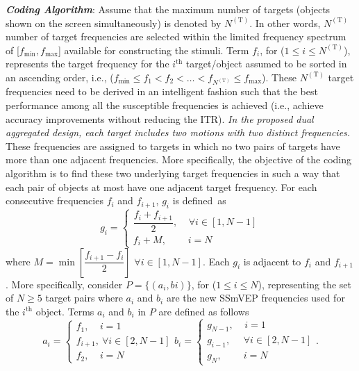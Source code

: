 \documentclass[sensors,accept,moreauthors,pdftex,10pt,a4paper]{mdpi}
\def\NT{N^{(\text{T})}}
\theoremstyle{mdpi}
\newcounter{thm}
\newcounter{ex}
\newcounter{re}
\theoremstyle{mdpidefinition}
\begin{document}
\vspace{.1in}
\noindent
\textbf{\textit{Coding Algorithm}}:
Assume that the maximum number of targets (objects shown on the screen simultaneously) is  denoted by $\NT$. In other words, $\NT$ number of target frequencies are selected within the limited frequency spectrum of [$f_{\min}, f_{\max}$] available for constructing the stimuli.  Term $f_{i}$, for ($1 \leq i \leq \NT$), represents the target frequency for the $i^{\text{th}}$ target/object assumed to be sorted in an ascending order, i.e., ($f_{\min} \leq f_1 < f_2 < \ldots < f_{\NT} \leq f_{\max}$). These $\NT$ target frequencies need to be derived in an intelligent fashion such that the best performance among all the susceptible frequencies is achieved (i.e., achieve accuracy improvements without reducing the ITR).
%
\textit{In the proposed dual aggregated design, each target includes two motions with two distinct frequencies.} These frequencies are assigned to targets in which no two pairs of targets have more than one adjacent frequencies. More specifically, the objective of the coding algorithm is to find these two underlying target frequencies in such a way that each pair of objects at most have one adjacent target frequency. For each consecutive frequencies $f_{i}$ and $f_{i+1}$,  $g_{i}$ is defined~as
%
\begin{equation}
g_{i} =
\begin{cases}
\dfrac{f_{i} + f_{i+1}}{2},  \:\:\:\:\:               \forall i \in [1,N-1]\\
f_{i} + M,        \:\:\:\:\:\:\:\:\:\:   i = N
\end{cases}
 \end{equation}
%
where $M = \min[\dfrac{f_{i+1}-f_{i}}{2}]$ $\forall i \in [1,N-1]$. Each $g_{i}$ is adjacent to $f_{i}$ and $f_{i+1}$. More specifically, consider $P=\{(a_{i},b{i})\}$, for ($1 \leq i \leq N$), representing the set of $N \geq 5$ target pairs where $a_{i}$ and $b_{i}$ are the new SSmVEP frequencies used for the $i^{\text{th}}$ object. Terms $a_{i}$ and $b_{i}$ in $P$ are defined as follows
%
\begin{equation}
a_{i} =\begin{cases}
f_{1},    \:\:\:\:\:          i = 1\\
f_{i+1},   \:   \forall i \in [2,N-1] \\
f_{2},     \:\:\:\:\:          i = N
\end{cases}
b_{i} =\begin{cases}
g_{N-1},  \:\:\:\:\:           i = 1\\
g_{i-1},        \:\:\:\:\:\:   \forall i \in [2,N-1] \\
g_{N},  \:\:\:\:\:\:\:\:\:\:             i = N
\end{cases}.
\end{equation}
%
\end{document}
